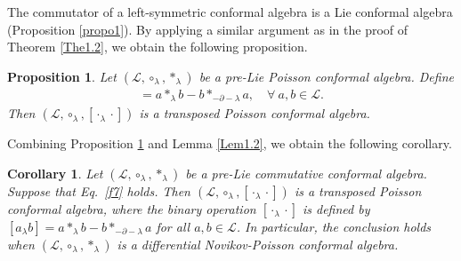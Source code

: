 \documentclass[11pt,letterpaper,reqno]{amsart}
\newtheorem{corollary}[theorem]{Corollary}
\newtheorem{proposition}[theorem]{Proposition}
\theoremstyle{definition}
\numberwithin{equation}{section}
\begin{document}
The commutator of a left-symmetric conformal algebra is a Lie conformal algebra (Proposition \ref{propo1}).
By applying a similar argument as in the proof of Theorem \ref{The1.2}, we obtain the following proposition.

\begin{proposition}\label{Pro2}
   Let $(\mathcal{L} ,\circ_\lambda,\ast_\lambda)$ be a pre-Lie Poisson conformal algebra. Define
   \begin{align}
      [a_{\lambda}b]=a\ast_{\lambda} b-b\ast_{-\partial-\lambda} a, \quad \forall ~a,b \in \mathcal{L}.
   \end{align}
Then $(\mathcal{L} ,\circ_\lambda,[\cdot_\lambda\cdot])$ is a transposed Poisson conformal algebra.
\end{proposition}

Combining Proposition \ref{Pro2} and Lemma \ref{Lem1.2}, we obtain the following corollary.
\begin{corollary}
   Let $(\mathcal{L} ,\circ_\lambda,\ast_\lambda)$ be a pre-Lie commutative conformal algebra. Suppose that Eq.~\eqref{f7} holds. Then $(\mathcal{L} ,\circ_\lambda,[\cdot_\lambda\cdot])$ is a transposed Poisson conformal algebra, where
   the binary operation $[\cdot_\lambda\cdot]$ is defined by $[a_{\lambda}b]=a\ast_{\lambda} b-b\ast_{-\partial-\lambda} a$ for all $a,b \in \mathcal{L}$. In particular, the conclusion holds when $(\mathcal{L} ,\circ_\lambda,\ast_\lambda)$ is a differential Novikov-Poisson conformal algebra.
\end{corollary}

\end{document}
